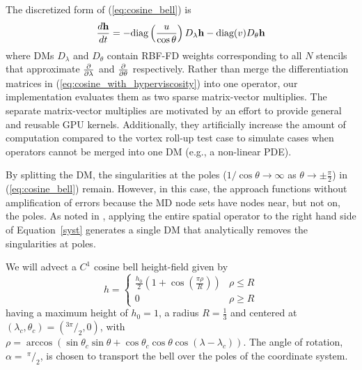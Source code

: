 The discretized form of (\ref{eq:cosine_bell}) is
\begin{equation}
\frac{d \mathbf{h}}{d t} = -\text{diag}\left(\frac{u}{\cos \theta}\right) D_\lambda \mathbf{h} - \text{diag}(v) D_\theta \mathbf{h}
\label{eq:cosine_with_hyperviscosity}
\end{equation}
where DMs $D_\lambda$ and $D_\theta$ contain RBF-FD weights corresponding to all $N$ stencils that approximate $\frac{\partial }{\partial \lambda}$ and $\frac{\partial }{\partial \theta}$ respectively. Rather than merge the differentiation matrices in (\ref{eq:cosine_with_hyperviscosity}) into one operator, our implementation evaluates them as two sparse matrix-vector multiplies. The separate matrix-vector multiplies are motivated by an effort to provide general and reusable GPU kernels. Additionally, they artificially increase the amount of computation compared to the vortex roll-up test case to simulate cases when operators cannot be merged into one DM (e.g., a non-linear PDE).

By splitting the DM, the singularities at the poles ($1 / \cos{\theta} \rightarrow \infty$ as $\theta \rightarrow \pm\frac{\pi}{2}$) in (\ref{eq:cosine_bell}) remain. However, in this case, the approach functions without amplification of errors because the MD node sets have nodes near, but not on, the poles. As noted in \cite{FlyerWright07, FornbergLehto11}, applying the entire spatial operator to the right hand side of Equation~\ref{syst} generates a single DM that analytically removes the singularities at poles. 

We will advect a $C^1$ cosine bell height-field given by
\begin{equation*}
h  =
\begin{cases}
\frac{h_0}{2} (1 + \cos(\frac{\pi \rho}{R}))  & \rho \le R  \\
 0 &  \rho \geq R
\end{cases}
\end{equation*}
having a maximum height of $h_0 = 1$, a radius $R = \frac{1}{3}$ and centered at $(\lambda_c, \theta_c) = (^{3\pi}/_{2}, 0)$, with 
$\rho = \arccos( \sin \theta_{c} \sin \theta + \cos \theta_{c} \cos \theta \cos (\lambda - \lambda_{c}) )$.
The angle of rotation, $\alpha =\ ^{\pi}/_{2}$, is chosen to transport the bell over the poles of the coordinate system.

